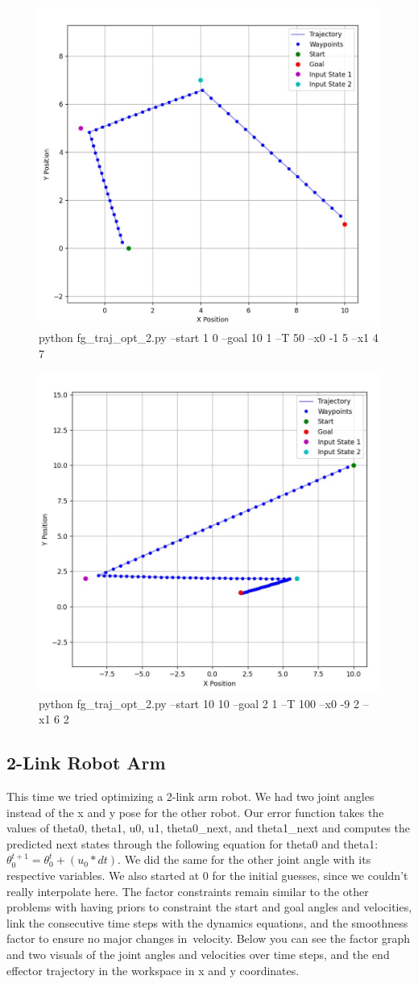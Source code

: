 \documentclass{article}
\begin{document}
\begin{figure} [H]
    \centering
    \includegraphics[width=0.5\linewidth]{latex_media/fg_traj_opt_constrained_2.jpg}
    \caption{python fg\_traj\_opt\_2.py --start 1 0 --goal 10 1 --T 50 --x0 -1 5 --x1 4 7}
    
\end{figure}

\begin{figure} [H]
    \centering
    \includegraphics[width=0.5\linewidth]{latex_media/fg_traj_opt_constrained_3.jpg}
    \caption{python fg\_traj\_opt\_2.py --start 10 10 --goal 2 1 --T 100 --x0 -9 2 --x1 6 2}
    
\end{figure}


\subsection{2-Link Robot Arm}
This time we tried optimizing a 2-link arm robot. We had two joint angles instead of the x and y pose for the other robot. Our error function takes the values of theta0, theta1, u0, u1, theta0\_next, and theta1\_next and computes the predicted next states through the following equation for theta0 and theta1: $\theta^{t+1}_0 = \theta^{t}_0+(u_{0}*dt)$. We did the same for the other joint angle with its respective variables. We also started at 0 for the initial guesses, since we couldn't really interpolate here. The factor constraints remain similar to the other problems with having priors to constraint the start and goal angles and velocities, link the consecutive time steps with the dynamics equations, and the smoothness factor to ensure no major changes in velocity. Below you can see the factor graph and two visuals of the joint angles and velocities over time steps, and the end effector trajectory in the workspace in x and y coordinates.
\end{document}

